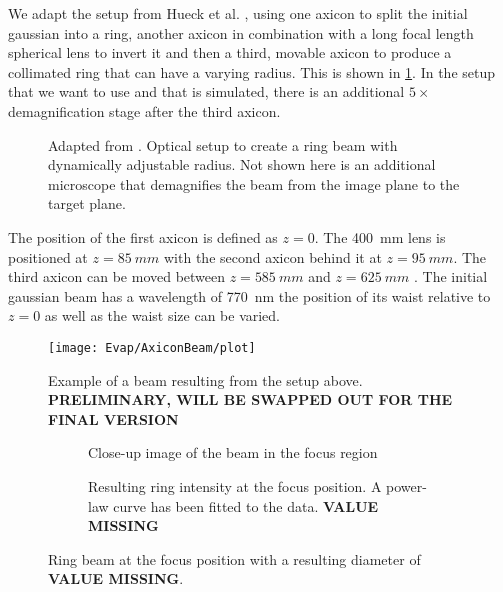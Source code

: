 We adapt the setup from Hueck et al. \cite{PhysRevLett.120.060402}, using one axicon \cite{McLeod} to split the initial gaussian into a ring, another axicon in combination with a long focal length spherical lens to invert it and then a third, movable axicon to produce a collimated ring that can have a varying radius. This is shown in \cref{fig:axicon_setup}. In the setup that we want to use and that is simulated, there is an additional $5\times$ demagnification stage after the third axicon.
\begin{figure}[htbp]
    \centering
    
    \caption[Optical setup to create a ring beam with dynamically adjustable radius]{Adapted from \cite{axiconSM}. Optical setup to create a ring beam with dynamically adjustable radius. Not shown here is an additional microscope that demagnifies the beam from the image plane to the target plane.}
    \label{fig:axicon_setup}
\end{figure}
The position of the first axicon is defined as $z=0$. The \SI{400}{mm} lens is positioned at $z=\SI{85}{mm}$ with the second axicon behind it at $z=\SI{95}{mm}$. The third axicon can be moved between $z=\SI{585}{mm}$ and $z=\SI{625}{mm}$ .
The initial gaussian beam has a wavelength of \SI{770}{nm} the position of its waist relative to $z=0$ as well as the waist size can be varied.

\begin{figure}[htbp]
    \centering
    \texttt{[image: Evap/AxiconBeam/plot]}
    \caption{Example of a beam resulting from the setup above. \textbf{PRELIMINARY, WILL BE SWAPPED OUT FOR THE FINAL VERSION}}
\end{figure}

\begin{figure}[htbp]
    \centering
    \begin{subfigure}[t]{0.49\textwidth}
        \centering
        \caption{Close-up image of the beam in the focus region}
    \end{subfigure}
    \begin{subfigure}[t]{0.49\textwidth}
        \centering
        \caption{Resulting ring intensity at the focus position. A power-law curve has been fitted to the data. \textbf{VALUE MISSING}}
    \end{subfigure}
    \caption{Ring beam at the focus position with a resulting diameter of \textbf{VALUE MISSING}.}
\end{figure}
